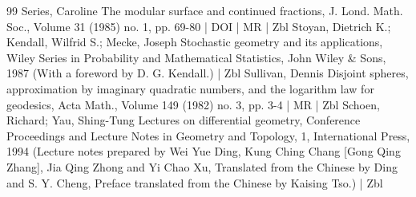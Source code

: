 \begin{thebibliography}{99}
Series, Caroline The modular surface and continued fractions, J. Lond. Math. Soc., Volume 31 (1985) no. 1, pp. 69-80 | DOI | MR | Zbl
Stoyan, Dietrich K.; Kendall, Wilfrid S.; Mecke, Joseph Stochastic geometry and its applications, Wiley Series in Probability and Mathematical Statistics, John Wiley \& Sons, 1987 (With a foreword by D. G. Kendall.) | Zbl
Sullivan, Dennis Disjoint spheres, approximation by imaginary quadratic numbers, and the logarithm law for geodesics, Acta Math., Volume 149 (1982) no. 3, pp. 3-4 | MR | Zbl
Schoen, Richard; Yau, Shing-Tung Lectures on differential geometry, Conference Proceedings and Lecture Notes in Geometry and Topology, 1, International Press, 1994 (Lecture notes prepared by Wei Yue Ding, Kung Ching Chang [Gong Qing Zhang], Jia Qing Zhong and Yi Chao Xu, Translated from the Chinese by Ding and S. Y. Cheng, Preface translated from the Chinese by Kaising Tso.) | Zbl
\end{thebibliography}
